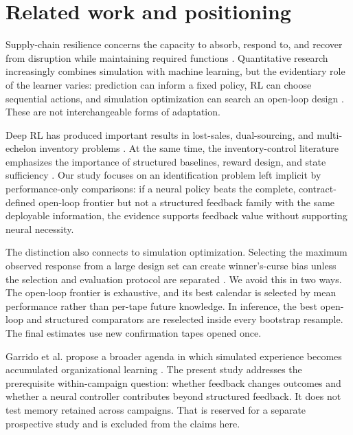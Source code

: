 \documentclass[preprint,12pt]{elsarticle}
\begin{document}


\section{Related work and positioning}

Supply-chain resilience concerns the capacity to absorb, respond to, and recover from disruption while maintaining required functions \cite{ponomarov2009understanding,hosseini2019review}. Quantitative research increasingly combines simulation with machine learning, but the evidentiary role of the learner varies: prediction can inform a fixed policy, RL can choose sequential actions, and simulation optimization can search an open-loop design \cite{badakhshan2024,yan2022,rolf2023}. These are not interchangeable forms of adaptation.

Deep RL has produced important results in lost-sales, dual-sourcing, and multi-echelon inventory problems \cite{gijsbrechts2022}. At the same time, the inventory-control literature emphasizes the importance of structured baselines, reward design, and state sufficiency \cite{boute2022}. Our study focuses on an identification problem left implicit by performance-only comparisons: if a neural policy beats the complete, contract-defined open-loop frontier but not a structured feedback family with the same deployable information, the evidence supports feedback value without supporting neural necessity.

The distinction also connects to simulation optimization. Selecting the maximum observed response from a large design set can create winner's-curse bias unless the selection and evaluation protocol are separated \cite{boesel2003}. We avoid this in two ways. The open-loop frontier is exhaustive, and its best calendar is selected by mean performance rather than per-tape future knowledge. In inference, the best open-loop and structured comparators are reselected inside every bootstrap resample. The final estimates use new confirmation tapes opened once.

Garrido et al. propose a broader agenda in which simulated experience becomes accumulated organizational learning \cite{garrido2024iccl}. The present study addresses the prerequisite within-campaign question: whether feedback changes outcomes and whether a neural controller contributes beyond structured feedback. It does not test memory retained across campaigns. That is reserved for a separate prospective study and is excluded from the claims here.
\end{document}
